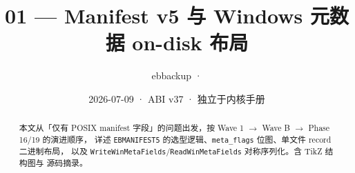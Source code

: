 \documentclass[12pt,a4paper]{ctexart}
\title{01 — Manifest v5 与 Windows 元数据 on-disk 布局}
\author{ebbackup · \filepath{engine\_cpp/src/engine/manifest.cc}}
\date{2026-07-09 · ABI v37 · 独立于内核手册}
\begin{document}
\maketitle
\begin{abstract}
本文从「仅有 POSIX manifest 字段」的问题出发，按 Wave 1 $\rightarrow$ Wave B $\rightarrow$ Phase 16/19 的演进顺序，
详述 \texttt{EBMANIFEST5} 的选型逻辑、\texttt{meta\_flags} 位图、单文件 record 二进制布局，
以及 \texttt{WriteWinMetaFields}/\texttt{ReadWinMetaFields} 对称序列化。含 TikZ 结构图与  源码摘录。
\end{abstract}
\tableofcontents
\newpage

\end{document}
